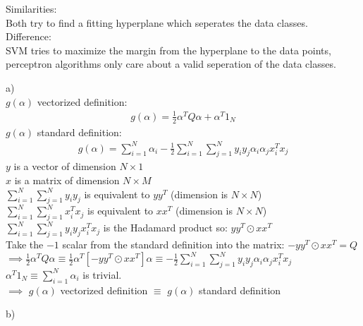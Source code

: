 %
%
%
\begin{flushleft}
Similarities: \\
Both try to find a fitting hyperplane which seperates the data classes.\\
Difference: \\
SVM tries to maximize the margin from the hyperplane to the data points, perceptron algorithms only care about a valid seperation of the data classes.
\end{flushleft}
%
%
%
\begin{flushleft}
a)\\
$g(\alpha)$ vectorized definition:
\begin{align*}
g(\alpha) = \frac{1}{2}\alpha^{T}Q\alpha + \alpha^{T}1_{N}
\end{align*}
$g(\alpha)$ standard definition:
\begin{align*}
g(\alpha) = \sum_{i=1}^{N}\alpha_{i}-\frac{1}{2}\sum_{i=1}^{N}\sum_{j=1}^{N}
y_{i}y_{j}\alpha_{i}\alpha_{j}x^{T}_{i}x_{j}
\end{align*}
$y$ is a vector of dimension $N\times 1$\\
$x$ is a matrix of dimension $N\times M$\\
$\sum_{i=1}^{N}\sum_{j=1}^{N}y_{i}y_{j}$ is equivalent to $yy^{T}$ 
(dimension is $N\times N$)\\
$\sum_{i=1}^{N}\sum_{j=1}^{N}x^{T}_{i}x_{j}$ is equivalent to $xx^{T}$ 
(dimension is $N\times N$)\\
$\sum_{i=1}^{N}\sum_{j=1}^{N}y_{i}y_{j}x^{T}_{i}x_{j}$ is the Hadamard product so:
$yy^{T} \odot xx^{T}$\\
Take the $-1$ scalar from the standard definition into the matrix: 
$-yy^{T} \odot xx^{T} = Q$\\
$\implies \frac{1}{2}\alpha^{T}Q\alpha \equiv \frac{1}{2}\alpha^{T}[-yy^{T} 
\odot xx^{T}]\alpha \equiv -\frac{1}{2}\sum_{i=1}^{N}\sum_{j=1}^{N}y_{i}y_{j}\alpha_{i}
\alpha_{j}x^{T}_{i}x_{j}$\\
$\alpha^{T}1_{N} \equiv \sum_{i=1}^{N}\alpha_{i}$ is trivial.\\
$\implies$ $g(\alpha)$ vectorized definition $\equiv$ $g(\alpha)$ standard definition
\end{flushleft}
\begin{flushleft}
b)\\

\end{flushleft}
%
%
%
%
%
%
%
%
%
%
%
%
%
%




